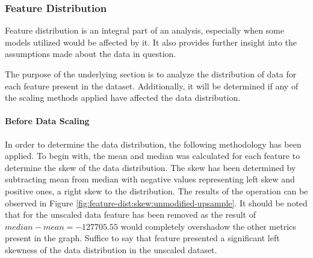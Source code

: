 \subsubsection{Feature Distribution}\label{sec:impl-data-analysis:feature-dist}
Feature distribution is an integral part of an analysis, especially when some models utilized would be affected by it. It also provides further insight into the assumptions made about the data in question.

The purpose of the underlying section is to analyze the distribution of data for each feature present in the dataset. Additionally, it will be determined if any of the scaling methods applied have affected the data distribution.

\paragraph{Before Data Scaling}\label{sec:impl-data-analysis:feature-dist-before-scaling}
In order to determine the data distribution, the following methodology has been applied. 
To begin with, the mean and median was calculated for each feature to determine the skew of the data distribution. The skew has been determined by subtracting mean from median with negative values representing left skew and positive ones, a right skew to the distribution. The results of the operation can be observed in Figure \ref{fig:feature-dist:skew:unmodified-upsample}. It should be noted that for the unscaled data \fileAgeInSec{} feature has been removed as the result of $median - mean = -127705.55$ would completely overshadow the other metrics present in the graph. Suffice to say that \fileAgeInSec{} feature presented a significant left skewness of the data distribution in the unscaled dataset.

